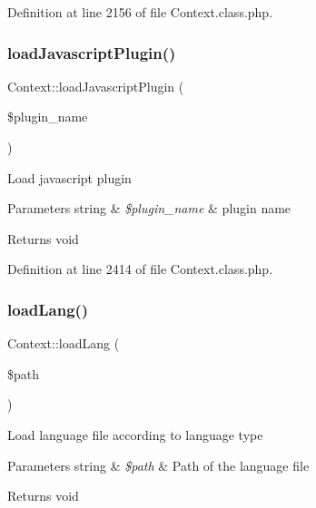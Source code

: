 Definition at line 2156 of file Context.\+class.\+php.

\mbox{\label{classContext_acaea76bdc1334df9c2f088103d619593}} 
\subsubsection{\texorpdfstring{load\+Javascript\+Plugin()}{loadJavascriptPlugin()}}
{\footnotesize\ttfamily Context\+::load\+Javascript\+Plugin (\begin{DoxyParamCaption}\item[{}]{\$plugin\+\_\+name }\end{DoxyParamCaption})}

Load javascript plugin


\begin{DoxyParams}[1]{Parameters}
string & {\em \$plugin\+\_\+name} & plugin name \\
\hline
\end{DoxyParams}
\begin{DoxyReturn}{Returns}
void 
\end{DoxyReturn}


Definition at line 2414 of file Context.\+class.\+php.

\mbox{\label{classContext_a7b22a741ff804e5cdaafd952273bd70c}} 
\subsubsection{\texorpdfstring{load\+Lang()}{loadLang()}}
{\footnotesize\ttfamily Context\+::load\+Lang (\begin{DoxyParamCaption}\item[{}]{\$path }\end{DoxyParamCaption})}

Load language file according to language type


\begin{DoxyParams}[1]{Parameters}
string & {\em \$path} & Path of the language file \\
\hline
\end{DoxyParams}
\begin{DoxyReturn}{Returns}
void 
\end{DoxyReturn}


